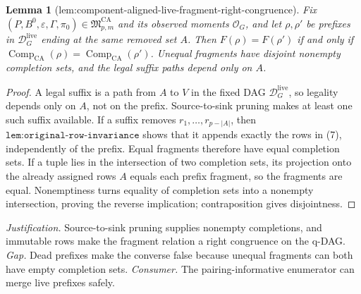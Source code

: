 \documentclass{article}
\newtheorem{lemma}{Lemma}
\begin{document}
\begin{lemma}[lem:component-aligned-live-fragment-right-congruence]\label{lem:component-aligned-live-fragment-right-congruence}
Fix \((P,B^0,\varepsilon,\Gamma,\pi_0)\in\mathfrak M_{p,m}^{\mathrm{CA}}\) and its observed moments \(\mathcal O_G\), and let \(\rho,\rho'\) be prefixes in \(\mathcal D_G^{\mathrm{live}}\) ending at the same removed set \(A\).  Then \(F(\rho)=F(\rho')\) if and only if \(\operatorname{Comp}_{\mathrm{CA}}(\rho)=\operatorname{Comp}_{\mathrm{CA}}(\rho')\).  Unequal fragments have disjoint nonempty completion sets, and the legal suffix paths depend only on \(A\).
\end{lemma}
\begin{proof}
A legal suffix is a path from \(A\) to \(V\) in the fixed DAG \(\mathcal D_G^{\mathrm{live}}\), so legality depends only on \(A\), not on the prefix.  Source-to-sink pruning makes at least one such suffix available.  If a suffix removes \(r_1,\ldots,r_{p-|A|}\), then \(\texttt{lem:original-row-invariance}\) shows that it appends exactly the rows in (7), independently of the prefix.  Equal fragments therefore have equal completion sets.  If a tuple lies in the intersection of two completion sets, its projection onto the already assigned rows \(A\) equals each prefix fragment, so the fragments are equal.  Nonemptiness turns equality of completion sets into a nonempty intersection, proving the reverse implication; contraposition gives disjointness.
\end{proof}
\par\smallskip\noindent \textit{Justification.} Source-to-sink pruning supplies nonempty completions, and immutable rows make the fragment relation a right congruence on the q-DAG. \textit{Gap.} Dead prefixes make the converse false because unequal fragments can both have empty completion sets. \textit{Consumer.} The pairing-informative enumerator can merge live prefixes safely.
\end{document}
